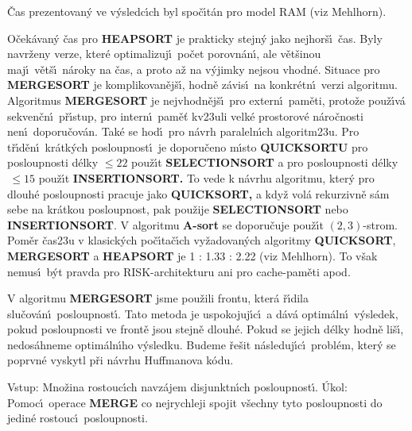\flushpar\v Cas prezentovan\'y ve v\'ysledc\'\i ch byl spo\v c\'\i t\'an 
pro model RAM (viz Mehlhorn).
\medskip

\flushpar O\v cek\'avan\'y \v cas pro {\bf HEAPSORT} je prakticky stejn\'y jako 
nej\-hor\v s\'\i\ \v cas.  Byly navr\v zeny verze, kter\'e optimalizuj\'\i\ 
po\v cet porov\-n\'an\'\i , ale v\v et\v sinou maj\'\i\ v\v et\v s\'\i\ n\'aroky na 
\v cas, a proto a\v z na v\'yjimky ne\-jsou vhodn\'e.  
Situace pro {\bf MERGESORT} je komplikovan\v ej\v s\'\i , hod\-n\v e z\'avis\'\i\ 
na konkr\'etn\'\i\ verzi algoritmu.  Algoritmus 
{\bf MER\-GE\-SORT} je nejvhodn\v ej\v s\'\i\ pro extern\'\i\ pam\v eti, proto\v ze 
pou\v z\'\i v\'a sekven\v cn\'\i\ p\v r\'\i stup, pro intern\'\i\ pam\v e\v t 
kv\accent23uli velk\'e prostorov\'e n\'aro\v cnosti 
nen\'\i\ doporu\v cov\'an.  Tak\'e se hod\'\i\ pro 
n\'avrh pa\-ra\-leln\'\i ch algoritm\accent23u. Pro t\v r\'\i d\v en\'\i\ 
kr\'atk\'ych posloupnost\'\i\ je doporu\v ceno m\'\i sto {\bf QUICKSORTU }
pro posloupnosti d\'elky $\le 22$ pou\v z\'\i t {\bf SELECTIONSORT} a pro 
posloupnosti d\'elky $\,\le 15$ pou\v z\'\i t {\bf INSERTIONSORT.}
To vede k n\'avrhu algoritmu, kter\'y 
pro dlouh\'e posloupnosti pracuje jako {\bf QUICKSORT,} a kdy\v z 
vol\'a rekurzivn\v e s\'am sebe na kr\'atkou posloupnost, pak 
pou\v zije {\bf SELECTIONSORT} ne\-bo {\bf INSERTIONSORT}. V algoritmu {\bf A-sort }
se doporu\-\v cu\-je pou\v z\'\i t $\left(2,3\right)$-strom.  
Pom\v er \v cas\accent23u v klasick\'ych po\v c\'\i ta\v c\'\i ch vy\v zadovan\'ych algoritmy {\bf QUICKSORT}, 
{\bf MERGESORT} a {\bf HEAPSORT} je 1 : 1.33 : 2.22 (viz Mehlhorn). To v\v sak nemus\'\i\ 
b\'yt pravda pro RISK-architekturu ani pro cache-pam\v eti 
apod. 
\medskip

\flushpar V algoritmu {\bf MERGESORT} jsme pou\v zili frontu, 
kter\'a \v r\'\i dila slu\v cov\'an\'\i\ posloupnost\'\i . Tato metoda je 
uspokojuj\'\i c\'\i\ a d\'av\'a optim\'aln\'\i\ v\'ysledek, pokud 
posloupnosti ve front\v e jsou stejn\v e dlouh\'e. Pokud se 
jejich d\'elky hodn\v e li\v s\'\i , nedos\'ahneme 
optim\'aln\'\i ho v\'ysledku. Budeme \v re\v sit n\'asleduj\'\i c\'\i\ 
probl\'em, kter\'y se poprvn\'e vyskytl p\v ri n\'avrhu Huffmanova k\'odu. 
\bigskip

\flushpar Vstup: Mno\v zina rostouc\'\i ch navz\'ajem 
disjunktn\'\i ch posloupnost\'\i .\newline 
\'Ukol:  Pomoc\'\i\ operace {\bf MERGE} co nejrychleji spojit 
v\v sechny tyto posloupnosti do jedin\'e rostouc\'\i\ posloupnosti.  
\medskip

